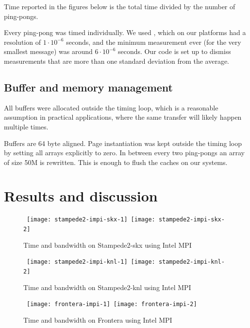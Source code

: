 Time reported in the figures below is the
total time divided by the number of ping-pongs.

\begin{details}
  Every ping-pong was timed individually. We used , which
  on our platforms had a resolution of $1\cdot10^{-6}$ seconds, and the
  minimum measurement ever (for the very smallest message) was around
  $6\cdot10^{-6}$ seconds.
  Our code is set up to dismiss measurements that are more
  than one standard deviation from the average.
\end{details}

\subsection{Buffer and memory management}

All buffers were allocated outside the timing loop,
which is a reasonable assumption in practical applications, where the
same transfer will likely happen multiple times.

Buffers are  64 byte aligned. Page instantiation was kept outside the
timing loop by setting all arrays explicitly to zero.
In between every two ping-pongs an array of size 50M is
rewritten. This is enough to flush the caches on our systems.

\section{Results and discussion}
\label{sec:results}

\def\scaling{.55}
\begin{figure*}[tb]
  \hbox\bgroup
  \kern-10pt
  \texttt{[image: stampede2-impi-skx-1]}
  \kern-20pt
  \texttt{[image: stampede2-impi-skx-2]}
  \egroup
  \caption{Time and bandwidth on Stampede2-skx using Intel MPI}
  \label{fig:skx}
\end{figure*}

\begin{figure*}[tb]
  \hbox\bgroup
  \kern-10pt
  \texttt{[image: stampede2-impi-knl-1]}
  \kern-20pt
  \texttt{[image: stampede2-impi-knl-2]}
  \egroup
  \caption{Time and bandwidth on Stampede2-knl using Intel MPI}
  \label{fig:knl}
\end{figure*}

\begin{figure*}[tb]
  \hbox\bgroup
  \kern-10pt
  \texttt{[image: frontera-impi-1]}
  \kern-20pt
  \texttt{[image: frontera-impi-2]}
  \egroup
  \caption{Time and bandwidth on Frontera using Intel MPI}
  \label{fig:clx-i}
\end{figure*}


